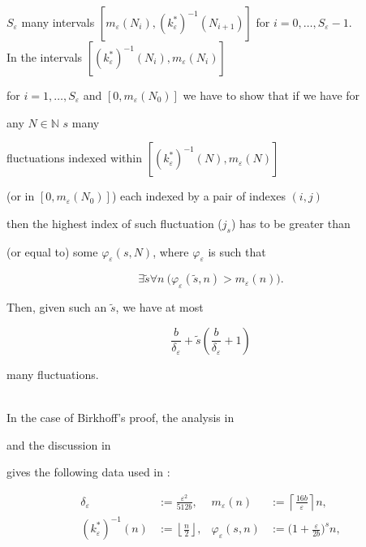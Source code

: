 \documentclass[1p]{elsarticle}
\newcommand{\NN}{\ensuremath{\mathbb{N}}}
\theoremstyle{plain}
\theoremstyle{definition}
\theoremstyle{remark}
\renewcommand{\phi}{\varphi}
\renewcommand{\epsilon}{\varepsilon}
\theoremstyle{definition}
\begin{document}
{$S_\epsilon$ many intervals $[m_\epsilon(N_i),(k^*_\epsilon)^{-1}

(N_{i+1})]$ for $i=0,\ldots,S_{\varepsilon}-1$.\\

In the intervals $[(k^*_\epsilon)^{-1}(N_{i}),m_\epsilon(N_i)]$ 

for $i=1,\ldots,

S_\epsilon$ and $[0,m_\epsilon(N_0)]$ we have to show that if we have for 

any $N\in\NN$ $s$ many

fluctuations indexed within $[(k^*_\epsilon)^{-1}(N),m_\epsilon(N)]$ 

(or in $[0,m_\epsilon(N_0)]$) each indexed by a pair of indexes $(i,j)$ 

then the highest index of such fluctuation ($j_s$) has to be greater than 

(or equal to) some $\phi_\epsilon(s,N)$, where $\phi_\epsilon$ is such that

\[

\exists \tilde s\forall n\ \big(\phi_\epsilon(\tilde s,n)>m_\epsilon(n)\big).

\]

Then, given such an $\tilde s$, we have at most

\[

\frac{b}{\delta_\epsilon}+\tilde s\left(\frac{b}{\delta_\epsilon}+1\right)

\]

many fluctuations.

\\[2mm]

In the case of Birkhoff's proof, the analysis in \cite{Kohlenbach/Leustean4} 

and the discussion in \cite{Avigad/Rute} 

gives the following data used in \cite{Avigad/Rute}: 

\begin{align*}

\delta_\epsilon &:= \frac{\epsilon^2}{512b},& m_\epsilon(n)&:=\left\lceil 

\frac{16b}{\epsilon}\right\rceil n,\\

(k^*_\epsilon)^{-1}(n)&:=\left\lfloor\frac{n}{2}\right\rfloor,& 

\phi_\epsilon(s,n)&:=\big(1+ \frac{\epsilon}{2b}\big)^s n,

\end{align*}

}
\end{document}
